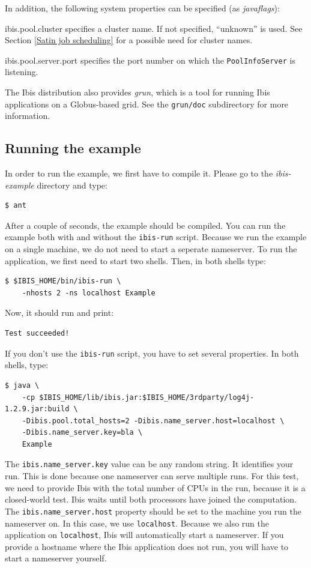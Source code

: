 \documentclass[10pt]{article}
\newcommand{\mysubsection}[1]{\subsection{#1}\label{#1}}
\begin{document}
In addition, the following system properties can be specified
(as \emph{javaflags}):
\begin{description}
\item{ibis.pool.cluster}
specifies a cluster name. If not specified,
``unknown'' is used.
See Section \ref{Satin job scheduling} for a possible need for cluster
names.
\item{ibis.pool.server.port}
specifies the port number on which the
\texttt{PoolInfoServer} is listening.
\end{description}

The Ibis distribution also provides \emph{grun}, which is a tool for
running Ibis applications on a Globus-based grid. See the
\texttt{grun/doc} subdirectory for more information.

\mysubsection{Running the example}
In order to run the example, we first have to compile it.
Please go to the \emph{ibis-example} directory and type:

\noindent
{\small
\begin{verbatim}
$ ant
\end{verbatim}
}
\noindent
After a couple of seconds, the example should be compiled.
You can run the example both with and without the \texttt{ibis-run} script.
Because we run the example on a single machine, we do not need to start a seperate nameserver.
To run the application, we first need to start two shells.
Then, in both shells type:

\noindent
{\small
\begin{verbatim}
$ $IBIS_HOME/bin/ibis-run \
    -nhosts 2 -ns localhost Example
\end{verbatim}
}
\noindent
Now, it should run and print:

\noindent
{\small
\begin{verbatim}
Test succeeded!
\end{verbatim}
}
\noindent
If you don't use the \texttt{ibis-run} script, you have to set several properties.
In both shells, type:

\noindent
{\small
\begin{verbatim}
$ java \
    -cp $IBIS_HOME/lib/ibis.jar:$IBIS_HOME/3rdparty/log4j-1.2.9.jar:build \
    -Dibis.pool.total_hosts=2 -Dibis.name_server.host=localhost \
    -Dibis.name_server.key=bla \
    Example
\end{verbatim}
}
\noindent
The \texttt{ibis.name\_server.key} value can be any random string.
It identifies your run.
This is done because one nameserver can serve multiple
runs. For this test, we need to provide Ibis with the total number of
CPUs in the run, because it is a closed-world test. Ibis waits until
both processors have joined the computation.
The \texttt{ibis.name\_server.host} property should
be set to the machine you run the nameserver on.  In this case, we use
\texttt{localhost}.
Because we also run the application on \texttt{localhost}, Ibis will
automatically start a nameserver. If you provide a hostname where the
Ibis application does not run, you will have to start a nameserver
yourself.
\end{document}
